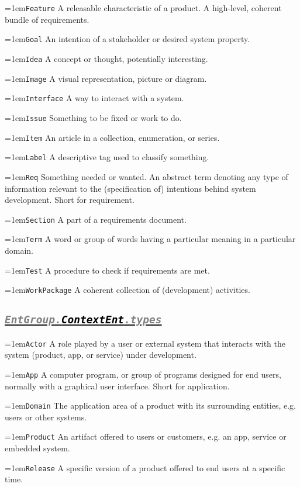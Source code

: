 \documentclass[a4paper,oneside]{article}
\newcommand\Concept[2]{\hangindent=1em\lstinline+#1+ #2}
\begin{document}
\begin{multicols*}{4}
\Concept{Feature}{A releasable characteristic of a product. A high-level, coherent bundle of requirements.}

\Concept{Goal}{An intention of a stakeholder or desired system property.}

\Concept{Idea}{A concept or thought, potentially interesting.}

\Concept{Image}{A visual representation, picture or diagram.}

\Concept{Interface}{A way to interact with a system.}

\Concept{Issue}{Something to be fixed or work to do.}

\Concept{Item}{An article in a collection, enumeration, or series.}

\Concept{Label}{A descriptive tag used to classify something.}

\Concept{Req}{Something needed or wanted. An abstract term denoting any type of information relevant to the (specification of) intentions behind system development. Short for requirement.}

\Concept{Section}{A part of a requirements document.}

\Concept{Term}{A word or group of words having a particular meaning in a particular domain.}

\Concept{Test}{A procedure to check if requirements are met.}

\Concept{WorkPackage}{A coherent collection of (development) activities.}


\subsection*{\underline{\texttt{\textit{{\textcolor{gray}{EntGroup.}\textcolor{black}{ContextEnt}}\textcolor{gray}{.types}}}}}
\Concept{Actor}{A role played by a user or external system that interacts with the system (product, app, or service) under development.}

\Concept{App}{A computer program, or group of programs designed for end users, normally with a graphical user interface. Short for application.}

\Concept{Domain}{The application area of a product with its surrounding entities, e.g. users or other systems.}

\Concept{Product}{An artifact offered to users or customers, e.g. an app, service or  embedded system.}

\Concept{Release}{A specific version of a product offered to end users at a specific time.}


\end{multicols*}
\end{document}

